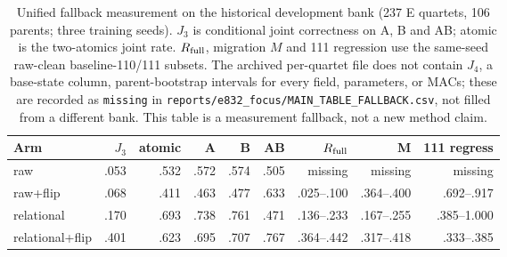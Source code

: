 \begin{table}[t]
\centering
\footnotesize
\begin{tabular}{@{}lrrrrrrrr@{}}
\toprule
Arm & $J_3$ & atomic & A & B & AB & $R_{\rm full}$ & M & 111 regress\\
\midrule
raw & .053 & .532 & .572 & .574 & .505 & missing & missing & missing\\
raw+flip & .068 & .411 & .463 & .477 & .633 & .025--.100 & .364--.400 & .692--.917\\
relational & .170 & .693 & .738 & .761 & .471 & .136--.233 & .167--.255 & .385--1.000\\
relational+flip & .401 & .623 & .695 & .707 & .767 & .364--.442 & .317--.418 & .333--.385\\
\bottomrule
\end{tabular}
\caption{Unified fallback measurement on the historical development bank
(237 E quartets, 106 parents; three training seeds). $J_3$ is conditional
joint correctness on A, B and AB; atomic is the two-atomics joint rate.
$R_{\rm full}$, migration $M$ and 111 regression use the same-seed
raw-clean baseline-110/111 subsets. The archived per-quartet file does not
contain $J_4$, a base-state column, parent-bootstrap intervals for every
field, parameters, or MACs; these are recorded as \texttt{missing} in
\texttt{reports/e832\_focus/MAIN\_TABLE\_FALLBACK.csv}, not filled from a
different bank. This table is a measurement fallback, not a new method
claim.}
\label{tab:fourarmunified}
\end{table}
